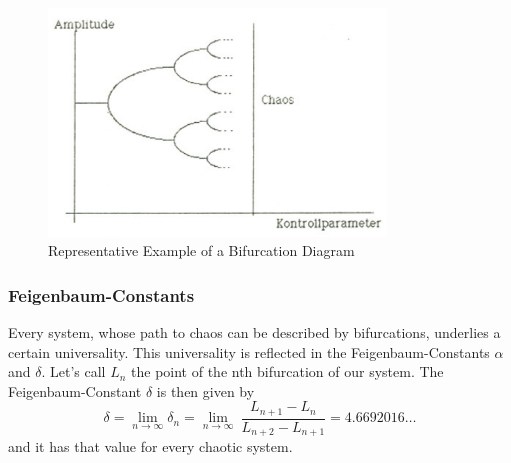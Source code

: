\begin{figure}[H]
\centering \includegraphics[width=0.8\textwidth]{Bilder/TheoBifDiag.png}
\caption{Representative Example of a Bifurcation Diagram}
\end{figure}

\subsubsection{Feigenbaum-Constants}

Every system, whose path to chaos can be described by bifurcations, underlies a certain universality. This universality is reflected in the Feigenbaum-Constants $\alpha$ and $\delta$.
Let's call $L_n$ the point of the nth bifurcation of our system. The Feigenbaum-Constant $\delta$ is then given by
\begin{equation} \delta = \lim_{n\to \infty} \delta_n = \lim_{n\to \infty}\ \frac{L_{n+1}-L_n}{L_{n+2}-L_{n+1}} = 4.6692016\dots \end{equation} and it has that value for every chaotic system.


